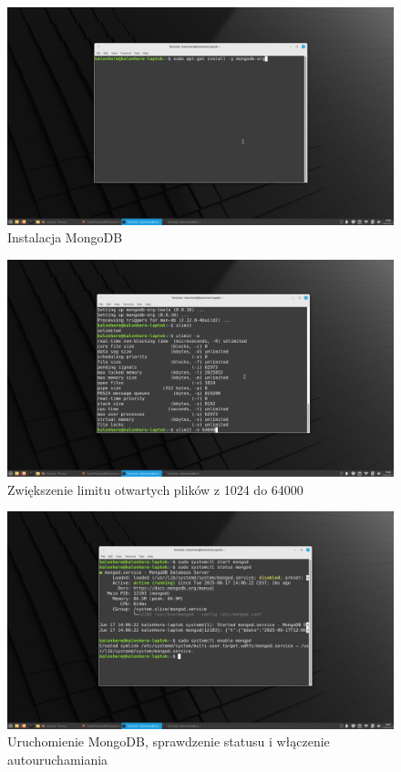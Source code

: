 \documentclass[11pt]{article}
\begin{document}
\newpage
		\begin{figure}[!ht]
			\includegraphics[width=\textwidth]{6_instalacja_mongodb.png}
			\caption{Instalacja MongoDB}
		\end{figure}
		\begin{figure}[!ht]
			\includegraphics[width=\textwidth]{7_zmiana_ustawien_dotyczacych_plikow.png}
			\caption{Zwiększenie limitu otwartych plików z 1024 do 64000}
		\end{figure}

\newpage
		\begin{figure}[!ht]
			\includegraphics[width=\textwidth]{8_uruchomienie_sprawdzenie_i_aktywacja_autouruchamiania_mongodb.png}
			\caption{Uruchomienie MongoDB, sprawdzenie statusu i włączenie autouruchamiania}
		\end{figure}
\end{document}
